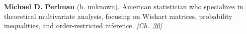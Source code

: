 \textbf{Michael D. Perlman} (b. unknown). American statistician who specializes in theoretical multivariate analysis, focusing on Wishart matrices, probability inequalities, and order-restricted inference. \emph{[Ch.~\hyperref[ch:simpsonsparadox]{30}]}

